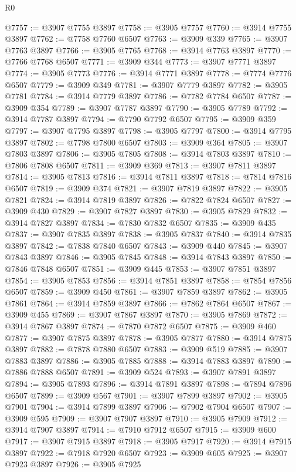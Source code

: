 \begin{lexlean}{R0}
\begin{coremodule}
@7757 := @3907 @7755 @3897
@7758 := @3905 @7757
@7760 := @3914 @7755 @3897
@7762 := @7758 @7760 @6507
@7763 := @3909 @339
@7765 := @3907 @7763 @3897
@7766 := @3905 @7765
@7768 := @3914 @7763 @3897
@7770 := @7766 @7768 @6507
@7771 := @3909 @344
@7773 := @3907 @7771 @3897
@7774 := @3905 @7773
@7776 := @3914 @7771 @3897
@7778 := @7774 @7776 @6507
@7779 := @3909 @349
@7781 := @3907 @7779 @3897
@7782 := @3905 @7781
@7784 := @3914 @7779 @3897
@7786 := @7782 @7784 @6507
@7787 := @3909 @354
@7789 := @3907 @7787 @3897
@7790 := @3905 @7789
@7792 := @3914 @7787 @3897
@7794 := @7790 @7792 @6507
@7795 := @3909 @359
@7797 := @3907 @7795 @3897
@7798 := @3905 @7797
@7800 := @3914 @7795 @3897
@7802 := @7798 @7800 @6507
@7803 := @3909 @364
@7805 := @3907 @7803 @3897
@7806 := @3905 @7805
@7808 := @3914 @7803 @3897
@7810 := @7806 @7808 @6507
@7811 := @3909 @369
@7813 := @3907 @7811 @3897
@7814 := @3905 @7813
@7816 := @3914 @7811 @3897
@7818 := @7814 @7816 @6507
@7819 := @3909 @374
@7821 := @3907 @7819 @3897
@7822 := @3905 @7821
@7824 := @3914 @7819 @3897
@7826 := @7822 @7824 @6507
@7827 := @3909 @430
@7829 := @3907 @7827 @3897
@7830 := @3905 @7829
@7832 := @3914 @7827 @3897
@7834 := @7830 @7832 @6507
@7835 := @3909 @435
@7837 := @3907 @7835 @3897
@7838 := @3905 @7837
@7840 := @3914 @7835 @3897
@7842 := @7838 @7840 @6507
@7843 := @3909 @440
@7845 := @3907 @7843 @3897
@7846 := @3905 @7845
@7848 := @3914 @7843 @3897
@7850 := @7846 @7848 @6507
@7851 := @3909 @445
@7853 := @3907 @7851 @3897
@7854 := @3905 @7853
@7856 := @3914 @7851 @3897
@7858 := @7854 @7856 @6507
@7859 := @3909 @450
@7861 := @3907 @7859 @3897
@7862 := @3905 @7861
@7864 := @3914 @7859 @3897
@7866 := @7862 @7864 @6507
@7867 := @3909 @455
@7869 := @3907 @7867 @3897
@7870 := @3905 @7869
@7872 := @3914 @7867 @3897
@7874 := @7870 @7872 @6507
@7875 := @3909 @460
@7877 := @3907 @7875 @3897
@7878 := @3905 @7877
@7880 := @3914 @7875 @3897
@7882 := @7878 @7880 @6507
@7883 := @3909 @519
@7885 := @3907 @7883 @3897
@7886 := @3905 @7885
@7888 := @3914 @7883 @3897
@7890 := @7886 @7888 @6507
@7891 := @3909 @524
@7893 := @3907 @7891 @3897
@7894 := @3905 @7893
@7896 := @3914 @7891 @3897
@7898 := @7894 @7896 @6507
@7899 := @3909 @567
@7901 := @3907 @7899 @3897
@7902 := @3905 @7901
@7904 := @3914 @7899 @3897
@7906 := @7902 @7904 @6507
@7907 := @3909 @595
@7909 := @3907 @7907 @3897
@7910 := @3905 @7909
@7912 := @3914 @7907 @3897
@7914 := @7910 @7912 @6507
@7915 := @3909 @600
@7917 := @3907 @7915 @3897
@7918 := @3905 @7917
@7920 := @3914 @7915 @3897
@7922 := @7918 @7920 @6507
@7923 := @3909 @605
@7925 := @3907 @7923 @3897
@7926 := @3905 @7925

\end{coremodule}
\end{lexlean}
